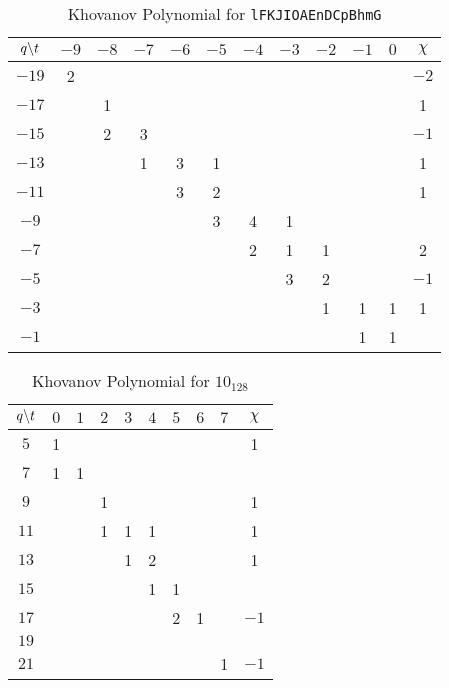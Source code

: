 \documentclass{article}
\theoremstyle{plain}
\begin{document}
        \begin{table}
            \centering
            \begin{tabular}{| c | c |c | c | c | c | c | c | c | c | c | c |}
                \hline
                $q\symbol{92}t$&$-9$&$-8$&$-7$&$-6$&$-5$&$-4$&$-3$&$-2$&$-1$&$0$&$\chi$\\
                \hline
                $-19$&2&&&&&&&&&&$-2$\\
                \hline
                $-17$&&1&&&&&&&&&1\\
                \hline
                $-15$&&2&3&&&&&&&&$-1$\\
                \hline
                $-13$&&&1&3&1&&&&&&1\\
                \hline
                $-11$&&&&3&2&&&&&&1\\
                \hline
                $-9$&&&&&3&4&1&&&&\\
                \hline
                $-7$&&&&&&2&1&1&&&2\\
                \hline
                $-5$&&&&&&&3&2&&&$-1$\\
                \hline
                $-3$&&&&&&&&1&1&1&1\\
                \hline
                $-1$&&&&&&&&&1&1&\\
                \hline
            \end{tabular}
            \caption{Khovanov Polynomial for \texttt{lFKJIOAEnDCpBhmG}}
        \end{table}
        \begin{table}
            \centering
            \begin{tabular}{| c | c | c | c | c | c | c | c | c | c |}
                \hline
                $q\symbol{92}t$&$0$&$1$&$2$&$3$&$4$&$5$&$6$&$7$&$\chi$\\
                \hline
                $5$&1&&&&&&&&1\\
                \hline
                $7$&1&1&&&&&&&\\
                \hline
                $9$&&&1&&&&&&1\\
                \hline
                $11$&&&1&1&1&&&&1\\
                \hline
                $13$&&&&1&2&&&&1\\
                \hline
                $15$&&&&&1&1&&&\\
                \hline
                $17$&&&&&&2&1&&$-1$\\
                \hline
                $19$&&&&&&&&&\\
                \hline
                $21$&&&&&&&&1&$-1$\\
                \hline
            \end{tabular}
            \caption{Khovanov Polynomial for $10_{128}$}
        \end{table}
\end{document}
